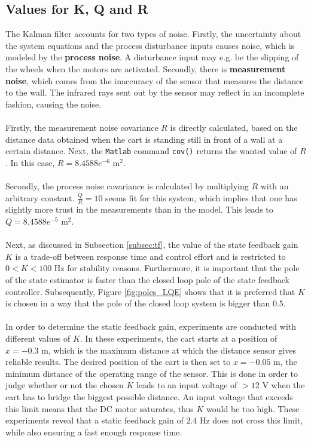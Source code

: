 \documentclass[a4paper,kul]{kulakarticle} %
\begin{document}
\subsection{Values for K, Q and R}
\label{subsec:kqr}
The Kalman filter accounts for two types of noise. Firstly, the uncertainty about the system equations and the process disturbance inputs causes noise, which is modeled by the \textbf{process noise}. A disturbance input may e.g. be the slipping of the wheels when the motors are activated. Secondly, there is \textbf{measurement noise}, which comes from the inaccuracy of the sensor that measures the distance to the wall. The infrared rays sent out by the sensor may reflect in an incomplete fashion, causing the noise. 
\\\\
Firstly, the measurement noise covariance $R$ is directly calculated, based on the distance data obtained when the cart is standing still in front of a wall at a certain distance. Next, the \texttt{Matlab} command \texttt{cov()} returns the wanted value of $R$. In this case, $R = 8.4588 e^{-6}$ m$^2$.
\\\\
Secondly, the process noise covariance is calculated by multiplying $R$ with an arbitrary constant. $\frac{Q}{R} = 10$ seems fit for this system, which implies that one has slightly more trust in the measurements than in the model. This leads to $Q = 8.4588 e^{-5}$ m$^2$.
\\\\
Next, as discussed in Subsection \ref{subsec:tf}, the value of the state feedback gain $K$ is a trade-off between response time and control effort and is restricted to $0 < K < 100$ Hz for stability reasons. Furthermore, it is important that the pole of the state estimator is faster than the closed loop pole of the state feedback controller. Subsequently, Figure \ref{fig:poles_LQE} shows that it is preferred that $K$ is chosen in a way that the pole of the closed loop system is bigger than $0.5$.
\\\\
In order to determine the static feedback gain, experiments are conducted with different values of $K$. In these experiments, the cart starts at a position of $x = -0.3$ m, which is the maximum distance at which the distance sensor gives reliable results. The desired position of the cart is then set to $x = -0.05$ m, the minimum distance of the operating range of the sensor. This is done in order to judge whether or not the chosen $K$ leads to an input voltage of $> 12$ V when the cart has to bridge the biggest possible distance. An input voltage that exceeds this limit means that the DC motor saturates, thus $K$ would be too high. These experiments reveal that a static feedback gain of $2.4$ Hz does not cross this limit, while also ensuring a fast enough response time.
\end{document}

